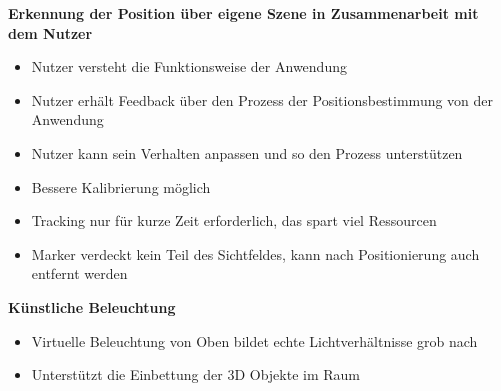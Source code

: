 \textbf{Erkennung der Position über eigene Szene in Zusammenarbeit mit dem Nutzer}
\begin{itemize}
	\item Nutzer versteht die Funktionsweise der Anwendung
	\item Nutzer erhält Feedback über den Prozess der Positionsbestimmung von der Anwendung
	\item Nutzer kann sein Verhalten anpassen und so den Prozess unterstützen
	\item Bessere Kalibrierung möglich
	\item Tracking nur für kurze Zeit erforderlich, das spart viel Ressourcen
	\item Marker verdeckt kein Teil des Sichtfeldes, kann nach Positionierung auch entfernt werden
\end{itemize}

\textbf{Künstliche Beleuchtung}
\begin{itemize}
	\item Virtuelle Beleuchtung von Oben bildet echte Lichtverhältnisse grob nach
	\item Unterstützt die Einbettung der 3D Objekte im Raum
\end{itemize}






